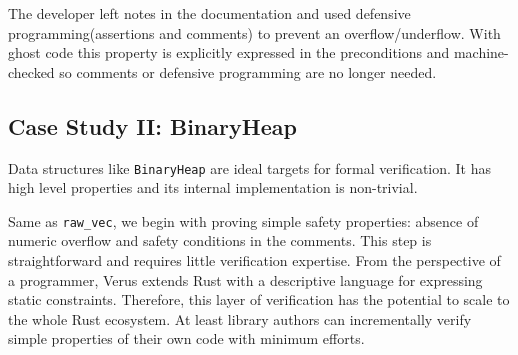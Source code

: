 \documentclass[conference]{IEEEtran}
\begin{document}
The developer left notes in the documentation and used defensive programming(assertions and comments) to prevent an overflow/underflow. With ghost code this property is explicitly expressed in the preconditions and machine-checked so comments or defensive programming are no longer needed.    
\subsection{Case Study II: BinaryHeap}
Data structures like \texttt{BinaryHeap} are ideal targets for formal verification. It has high level properties and its internal implementation is non-trivial. 

Same as \texttt{raw\_vec}, we begin with proving simple safety properties: absence of numeric overflow and safety conditions in the comments. This step is straightforward and requires little verification expertise. From the perspective of a programmer, Verus extends Rust with a descriptive language for expressing static constraints. Therefore, this layer of verification has the potential to scale to the whole Rust ecosystem. At least library authors can incrementally verify simple properties of their own code with minimum efforts.     
\end{document}
